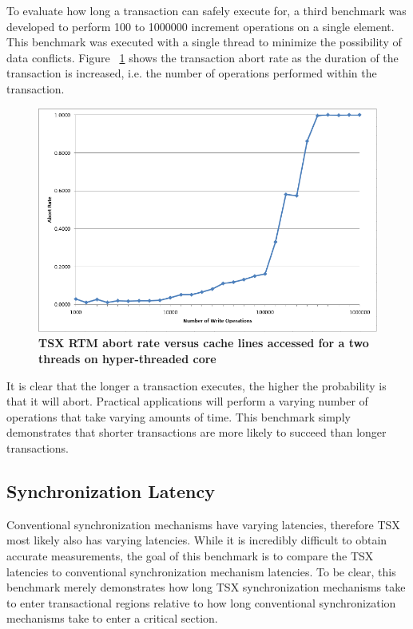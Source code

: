\documentclass[a4paper]{article}
\begin{document}
\indent
To evaluate how long a transaction can safely execute for, a third
benchmark was developed to perform 100 to 1000000 increment operations on a
single element.  This benchmark was executed with a single thread to minimize
the possibility of data conflicts. Figure ~\ref{fig:trx_duration} shows the
transaction abort rate as the duration of the transaction is increased, i.e. the
number of operations performed within the transaction.
\par

\begin{figure}[H]
    \centering
    \graphicspath{ {./figures/} }
    \includegraphics[width=\textwidth,height=\textheight,keepaspectratio]{trx_duration}
    \caption{\textbf{TSX RTM abort rate versus cache lines accessed for a two 
    threads on hyper-threaded core}}
    \label{fig:trx_duration}
\end{figure}

\indent 
It is clear that the longer a transaction executes, the higher the probability
is that it will abort.  Practical applications will perform a varying number of
operations that take varying amounts of time.  This benchmark simply
demonstrates that shorter transactions are more likely to succeed than longer
transactions.
\par

\subsection{\textbf{Synchronization Latency}}

\indent
Conventional synchronization mechanisms have varying latencies, therefore TSX
most likely also has varying latencies.  While it is incredibly difficult to
obtain accurate measurements, the goal of this benchmark is to compare the TSX
latencies to conventional synchronization mechanism latencies.  To be clear,
this benchmark merely demonstrates how long TSX synchronization mechanisms take
to enter transactional regions relative to how long conventional synchronization
mechanisms take to enter a critical section.
\par
\end{document}
